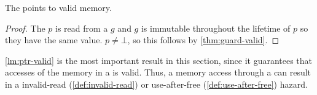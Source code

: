 \begin{lemma}\label{lm:ptr-valid}
  The  points to valid memory.
\end{lemma}
\begin{proof}
  The   $p$ is read from a  $g$ and $g$ is immutable throughout the lifetime of
  $p$ so they have the same value. $p \neq \bot$, so this follows by \cref{thm:guard-valid}.
\end{proof}

\cref{lm:ptr-valid} is the most important result in this section, since it guarantees that
accesses of the memory in a  is valid. Thus, a memory access through a  can result
in a invalid-read (\cref{def:invalid-read}) or use-after-free (\cref{def:use-after-free})
hazard.
